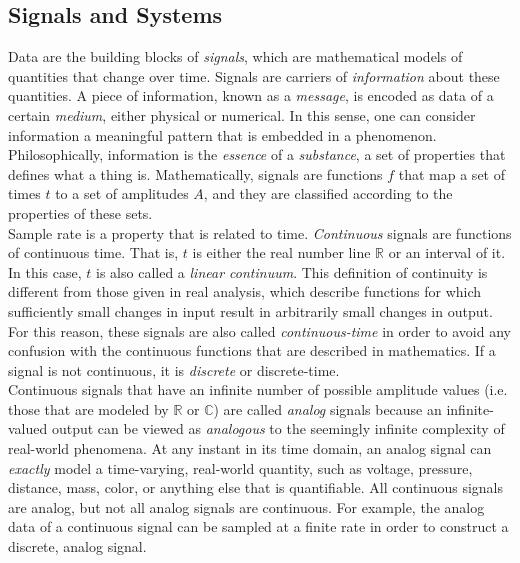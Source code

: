 

\subsection{Signals and Systems}

Data are the building blocks of \textit{signals}, which are mathematical models of quantities that change over time. Signals are carriers of \textit{information} about these quantities. A piece of information, known as a \textit{message}, is encoded as data of a certain \textit{medium}, either physical or numerical. In this sense, one can consider information a meaningful pattern that is embedded in a phenomenon. Philosophically, information is the \textit{essence} of a \textit{substance}, a set of properties that defines what a thing is. Mathematically, signals are functions $f$ that map a set of times $t$ to a set of amplitudes $A$, and they are classified according to the properties of these sets. \\

Sample rate is a property that is related to time. \textit{Continuous} signals are functions of continuous time. That is, $t$ is either the real number line $\mathbb{R}$ or an interval of it. In this case, $t$ is also called a \textit{linear continuum}. This definition of continuity is different from those given in real analysis, which describe functions for which sufficiently small changes in input result in arbitrarily small changes in output. For this reason, these signals are also called \textit{continuous-time} in order to avoid any confusion with the continuous functions that are described in mathematics. If a signal is not continuous, it is \textit{discrete} or discrete-time. \\

Continuous signals that have an infinite number of possible amplitude values (i.e. those that are modeled by $\mathbb{R}$ or $\mathbb{C}$) are called \textit{analog} signals because an infinite-valued output can be viewed as \textit{analogous} to the seemingly infinite complexity of real-world phenomena. At any instant in its time domain, an analog signal can \textit{exactly} model a time-varying, real-world quantity, such as voltage, pressure, distance, mass, color, or anything else that is quantifiable. All continuous signals are analog, but not all analog signals are continuous. For example, the analog data of a continuous signal can be sampled at a finite rate in order to construct a discrete, analog signal. \\

